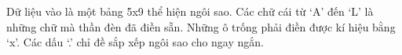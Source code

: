 Dữ liệu vào là một bảng 5x9 thể hiện ngôi sao. Các chữ cái từ ‘A’ đến ‘L’ là những chữ mà thần đèn đã điền sẵn. Những ô trống phải điền được kí hiệu bằng ‘x’. Các dấu ‘.’ chỉ đề sắp xếp ngôi sao cho ngay ngắn.